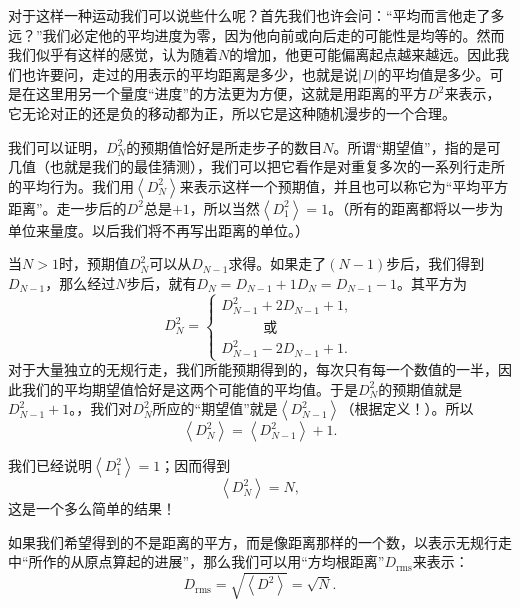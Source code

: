 \documentclass[12pt,oneside]{book}
\providecommand{\abs}[1]{\lvert#1\rvert}
\begin{document}
对于这样一种运动我们可以说些什么呢？首先我们也许会问：“平均而言他走了多远？”我们必定他的平均进度为零，因为他向前或向后走的可能性是均等的。然而我们似乎有这样的感觉，认为随着$N$的增加，他更可能偏离起点越来越远。因此我们也许要问，走过的用表示的平均距离是多少，也就是说$\abs{D}$的平均值是多少。可是在这里用另一个量度“进度”的方法更为方便，这就是用距离的平方$D^2$来表示，它无论对正的还是负的移动都为正，所以它是这种随机漫步的一个合理。

我们可以证明，$D_N^2$的预期值恰好是所走步子的数目$N$。所谓“期望值”，指的是可几值（也就是我们的最佳猜测），我们可以把它看作是对重复多次的一系列行走所的平均行为。我们用$\left <D_N^2 \right >$来表示这样一个预期值，并且也可以称它为“平均平方距离”。走一步后的$D^2$总是$+1$，所以当然$\left < D_1^2 \right >=1$。（所有的距离都将以一步为单位来量度。以后我们将不再写出距离的单位。）

当$N>1$时，预期值$D_N^2$可以从$D_{N-1}$求得。如果走了$(N-1)$步后，我们得到$D_{N-1}$，那么经过$N$步后，就有$D_N=D_{N-1}+1$$D_N=D_{N-1}-1$。其平方为
\begin{equation}
\label{Eq:I:6:7}
D_N^2=
\begin{cases}
D_{N-1}^2+2D_{N-1}+1,\\[2ex]
\quad\qquad\textit{或}\\[2ex]
D_{N-1}^2-2D_{N-1}+1.
\end{cases}
\end{equation}
对于大量独立的无规行走，我们所能预期得到的，每次只有每一个数值的一半，因此我们的平均期望值恰好是这两个可能值的平均值。于是$D_N^2$的预期值就是$D_{N-1}^2+1$。，我们对$D_N^2$所应的“期望值”就是$\left <D_{N-1}^2 \right >$（根据定义！）。所以
\begin{equation}
\label{Eq:I:6:8}
\left < D_N^2 \right >=\left < D_{N-1}^2 \right >+1.
\end{equation}

我们已经说明$\left < D_1^2 \right > = 1$；因而得到
\begin{equation}
\label{Eq:I:6:9}
\left < D_N^2 \right > =N,
\end{equation} 
这是一个多么简单的结果！

如果我们希望得到的不是距离的平方，而是像距离那样的一个数，以表示无规行走中“所作的从原点算起的进展”，那么我们可以用“方均根距离”$D_{\text{rms}}$来表示：
\begin{equation}
\label{Eq:I:6:10}
D_{\text{rms}}=\sqrt{\left < D^2 \right > }=\sqrt{N}.
\end{equation}
\end{document}
